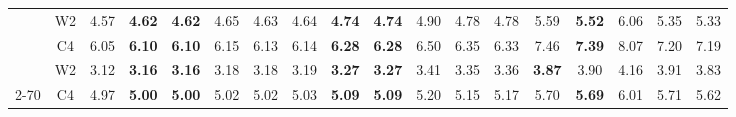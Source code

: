 \begin{table}[t]
\begin{tabular}{@{}cccccccccccccccccc@{}}
\rowcolor[HTML]{D9D9D9} 
\cellcolor[HTML]{D9D9D9}                       & \multicolumn{1}{c|}{\cellcolor[HTML]{D9D9D9}W2} & \multicolumn{1}{c|}{\cellcolor[HTML]{D9D9D9}4.57} & \textbf{4.62} & \textbf{4.62} & \multicolumn{1}{c|}{\cellcolor[HTML]{D9D9D9}4.65} & 4.63  & \multicolumn{1}{c|}{\cellcolor[HTML]{D9D9D9}4.64} & \textbf{4.74} & \textbf{4.74} & \multicolumn{1}{c|}{\cellcolor[HTML]{D9D9D9}4.90} & 4.78  & \multicolumn{1}{c|}{\cellcolor[HTML]{D9D9D9}4.78} & 5.59          & \textbf{5.52} & \multicolumn{1}{c|}{\cellcolor[HTML]{D9D9D9}6.06} & 5.35   & 5.33                      \\
\rowcolor[HTML]{D9D9D9} 
\multirow{-2}{*}{\cellcolor[HTML]{D9D9D9}2-13} & \multicolumn{1}{c|}{\cellcolor[HTML]{D9D9D9}C4} & \multicolumn{1}{c|}{\cellcolor[HTML]{D9D9D9}6.05} & \textbf{6.10} & \textbf{6.10} & \multicolumn{1}{c|}{\cellcolor[HTML]{D9D9D9}6.15} & 6.13  & \multicolumn{1}{c|}{\cellcolor[HTML]{D9D9D9}6.14} & \textbf{6.28} & \textbf{6.28} & \multicolumn{1}{c|}{\cellcolor[HTML]{D9D9D9}6.50} & 6.35  & \multicolumn{1}{c|}{\cellcolor[HTML]{D9D9D9}6.33} & 7.46          & \textbf{7.39} & \multicolumn{1}{c|}{\cellcolor[HTML]{D9D9D9}8.07} & 7.20   & 7.19                      \\
                                               & \multicolumn{1}{c|}{W2}                         & \multicolumn{1}{c|}{3.12}                         & \textbf{3.16} & \textbf{3.16} & \multicolumn{1}{c|}{3.18}                         & 3.18  & \multicolumn{1}{c|}{3.19}                         & \textbf{3.27} & \textbf{3.27} & \multicolumn{1}{c|}{3.41}                         & 3.35  & \multicolumn{1}{c|}{3.36}                         & \textbf{3.87} & 3.90          & \multicolumn{1}{c|}{4.16}                         & 3.91   & 3.83                      \\
\multirow{-2}{*}{2-70}                         & \multicolumn{1}{c|}{C4}                         & \multicolumn{1}{c|}{4.97}                         & \textbf{5.00} & \textbf{5.00} & \multicolumn{1}{c|}{5.02}                         & 5.02  & \multicolumn{1}{c|}{5.03}                         & \textbf{5.09} & \textbf{5.09} & \multicolumn{1}{c|}{5.20}                         & 5.15  & \multicolumn{1}{c|}{5.17}                         & 5.70          & \textbf{5.69} & \multicolumn{1}{c|}{6.01}                         & 5.71   & 5.62                      \\ \bottomrule
\end{tabular}
\label{tab:llamacomp}
\end{table}